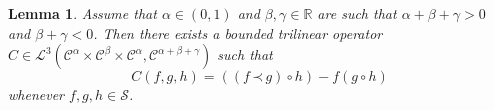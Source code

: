 \documentclass[a4paper,11pt]{article}
\newtheorem{lemma}[theorem]{Lemma}
\theoremstyle{remark}
\newcommand{\Lcal}{\mathcal{L}}
\newcommand{\CC}{\ensuremath{\mathscr{C}}}
\newcommand{\CS}{\ensuremath{\mathscr{S}}}
\newcommand{\lpara}{\,\mathord{\prec}\,}
\newcommand{\reso}{\,\mathord{\circ}\,}
\begin{document}
\begin{lemma}\label{lemma:commutator}
   Assume that $\alpha \in ( 0,1 )$ and $\beta , \gamma \in \mathbb{R}$ are such that $\alpha + \beta + \gamma >0$ and $\beta + \gamma <0$. Then there exists a bounded trilinear operator $C \in \Lcal^{3} \left( \CC^{\alpha}\! \times\! \CC^{\beta}\! \times\! \CC^{\alpha}, \CC^{\alpha + \beta + \gamma} \right)$ such that
  \[
     C ( f,g,h ) = ( ( f \lpara g ) \reso h ) -f ( g \reso h )
  \]
  whenever $f,g,h \in \CS$.
\end{lemma}
\end{document}
